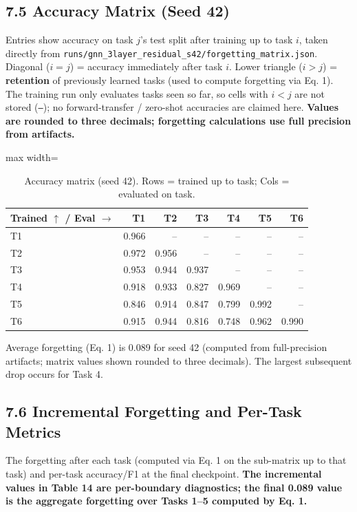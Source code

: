 \documentclass[11pt,a4paper]{article}
\begin{document}
\subsection*{7.5 Accuracy Matrix (Seed 42)}
Entries show accuracy on task $j$'s test split after training up to task $i$, taken directly from \texttt{runs/gnn\_3layer\_residual\_s42/forgetting\_matrix.json}. Diagonal ($i=j$) = accuracy immediately after task $i$. Lower triangle ($i > j$) = \textbf{retention} of previously learned tasks (used to compute forgetting via Eq. 1). The training run only evaluates tasks seen so far, so cells with $i < j$ are not stored (\texttt{--}); no forward-transfer / zero-shot accuracies are claimed here. \textbf{Values are rounded to three decimals; forgetting calculations use full precision from artifacts.}

\begin{table}[H]
\centering
\caption{Accuracy matrix (seed 42). Rows = trained up to task; Cols = evaluated on task.}
\label{tab:accuracy-matrix}
\begin{adjustbox}{max width=\textwidth}
\begin{tabular}{lrrrrrr}
\toprule
Trained $\uparrow$ / Eval $\rightarrow$ & T1 & T2 & T3 & T4 & T5 & T6 \\
\midrule
T1 & 0.966 & -- & -- & -- & -- & -- \\
T2 & 0.972 & 0.956 & -- & -- & -- & -- \\
T3 & 0.953 & 0.944 & 0.937 & -- & -- & -- \\
T4 & 0.918 & 0.933 & 0.827 & 0.969 & -- & -- \\
T5 & 0.846 & 0.914 & 0.847 & 0.799 & 0.992 & -- \\
T6 & 0.915 & 0.944 & 0.816 & 0.748 & 0.962 & 0.990 \\
\bottomrule
\end{tabular}
\end{adjustbox}
\end{table}
Average forgetting (Eq. 1) is \num{0.089} for seed 42 (computed from full-precision artifacts; matrix values shown rounded to three decimals). The largest subsequent drop occurs for Task 4.

\subsection*{7.6 Incremental Forgetting and Per-Task Metrics}
The forgetting after each task (computed via Eq. 1 on the sub-matrix up to that task) and per-task accuracy/F1 at the final checkpoint. \textbf{The incremental values in Table 14 are per-boundary diagnostics; the final 0.089 value is the aggregate forgetting over Tasks 1--5 computed by Eq. 1.}
\end{document}
